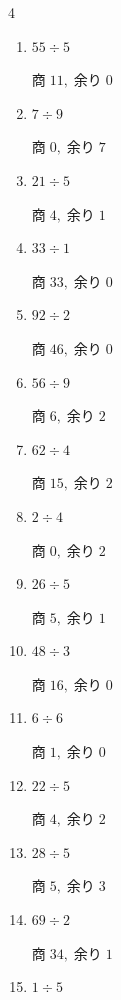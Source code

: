 \begin{multicols}{4}
\begin{enumerate}
  \item $55 \div 5$

        $商\; 11,\; 余り\; 0$

  \item $7 \div 9$

        $商\; 0,\; 余り\; 7$

  \item $21 \div 5$

        $商\; 4,\; 余り\; 1$

  \item $33 \div 1$

        $商\; 33,\; 余り\; 0$

  \item $92 \div 2$

        $商\; 46,\; 余り\; 0$

  \item $56 \div 9$

        $商\; 6,\; 余り\; 2$

\columnbreak %

\resetques

  \item $62 \div 4$

        $商\; 15,\; 余り\; 2$

  \item $2 \div 4$

        $商\; 0,\; 余り\; 2$

  \item $26 \div 5$

        $商\; 5,\; 余り\; 1$

  \item $48 \div 3$

        $商\; 16,\; 余り\; 0$

  \item $6 \div 6$

        $商\; 1,\; 余り\; 0$

  \item $22 \div 5$

        $商\; 4,\; 余り\; 2$

  \item $28 \div 5$

        $商\; 5,\; 余り\; 3$

  \item $69 \div 2$

        $商\; 34,\; 余り\; 1$

  \item $1 \div 5$


\end{enumerate}
\end{multicols}
